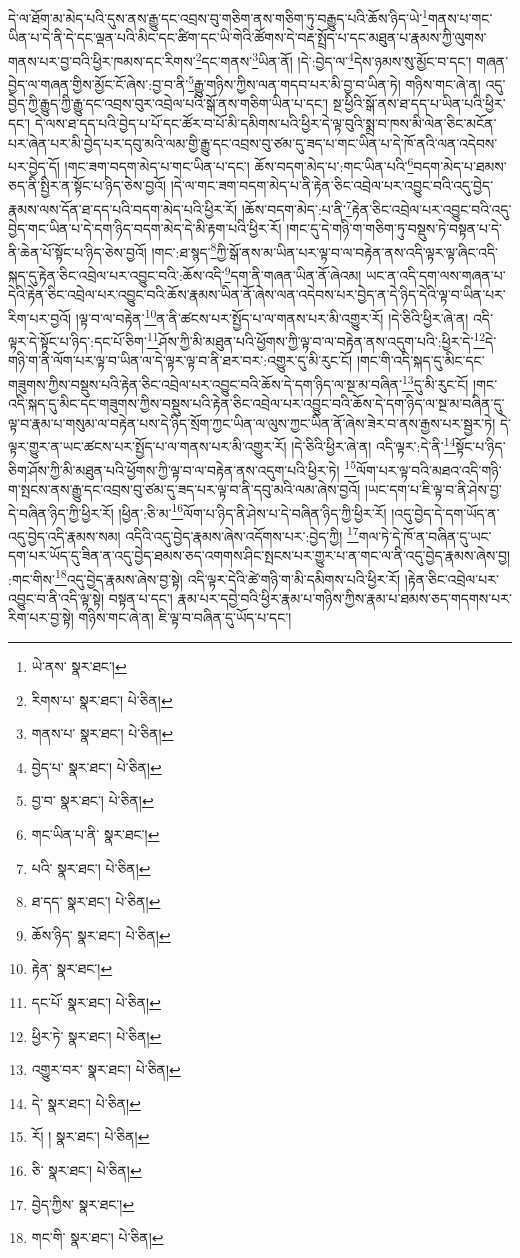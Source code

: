 དེ་ལ་ཐོག་མ་མེད་པའི་དུས་ནས་རྒྱུ་དང་འབྲས་བུ་གཅིག་ནས་གཅིག་ཏུ་བརྒྱུད་པའི་ཆོས་ཉིད་ཡེ་\footnote{ཡེ་ནས་  སྣར་ཐང་། }གནས་པ་གང་ཡིན་པ་དེ་ནི་དེ་དང་ལྡན་པའི་མིང་དང་ཚིག་དང་ཡི་གེའི་ཚོགས་དེ་བརྡ་སྤྲོད་པ་དང་མཐུན་པ་རྣམས་ཀྱི་ལུགས་གནས་པར་བྱ་བའི་ཕྱིར་ཁམས་དང་རིགས་\footnote{རིགས་པ་  སྣར་ཐང་།  པེ་ཅིན། }དང་གནས་\footnote{གནས་པ་  སྣར་ཐང་།  པེ་ཅིན། }ཡིན་ནོ། །དེ་:བྱེད་ལ་\footnote{བྱེད་པ་  སྣར་ཐང་།  པེ་ཅིན། }དེས་ཉམས་སུ་མྱོང་བ་དང་། གཞན་བྱེད་ལ་གཞན་གྱིས་མྱོང་ངོ་ཞེས་:བྱ་བ་ནི་\footnote{བྱ་བ་  སྣར་ཐང་།  པེ་ཅིན། }རྒྱུ་གཉིས་ཀྱིས་ལན་གདབ་པར་མི་བྱ་བ་ཡིན་ཏེ། གཉིས་གང་ཞེ་ན། འདུ་བྱེད་ཀྱི་རྒྱུད་ཀྱི་རྒྱུ་དང་འབྲས་བུར་འབྲེལ་པའི་སྒོ་ནས་གཅིག་ཡིན་པ་དང་། སྔ་ཕྱིའི་སྒོ་ནས་ཐ་དད་པ་ཡིན་པའི་ཕྱིར་དང་། དེ་ལས་ཐ་དད་པའི་བྱེད་པ་པོ་དང་ཚོར་བ་པོ་མི་དམིགས་པའི་ཕྱིར་དེ་ལྟ་བུའི་སྨྲ་བ་ཁས་མི་ལེན་ཅིང་མངོན་པར་ཞེན་པར་མི་བྱེད་པར་དབུ་མའི་ལམ་གྱི་རྒྱུ་དང་འབྲས་བུ་ཙམ་དུ་ཟད་པ་གང་ཡིན་པ་དེ་ཁོ་ནའི་ལན་འདེབས་པར་བྱེད་དོ། །གང་ཟག་བདག་མེད་པ་གང་ཡིན་པ་དང་། ཆོས་བདག་མེད་པ་:གང་ཡིན་པའི་\footnote{གང་ཡིན་པ་ནི་  སྣར་ཐང་། }བདག་མེད་པ་ཐམས་ཅད་ནི་སྤྱིར་ན་སྟོང་པ་ཉིད་ཅེས་བྱའོ། །དེ་ལ་གང་ཟག་བདག་མེད་པ་ནི་རྟེན་ཅིང་འབྲེལ་པར་འབྱུང་བའི་འདུ་བྱེད་རྣམས་ལས་དོན་ཐ་དད་པའི་བདག་མེད་པའི་ཕྱིར་རོ། །ཆོས་བདག་མེད་:པ་ནི་\footnote{པའི་  སྣར་ཐང་།  པེ་ཅིན། }རྟེན་ཅིང་འབྲེལ་པར་འབྱུང་བའི་འདུ་བྱེད་གང་ཡིན་པ་དེ་དག་ཉིད་བདག་མེད་དེ་མི་རྟག་པའི་ཕྱིར་རོ། །གང་དུ་དེ་གཉི་ག་གཅིག་ཏུ་བསྡུས་ཏེ་བསྟན་པ་དེ་ནི་ཆེན་པོ་སྟོང་པ་ཉིད་ཅེས་བྱའོ། །གང་:ཐ་སྙད་\footnote{ཐ་དད་  སྣར་ཐང་།  པེ་ཅིན། }ཀྱི་སྒོ་ནས་མ་ཡིན་པར་ལྟ་བ་ལ་བརྟེན་ནས་འདི་ལྟར་ལྟ་ཞིང་འདི་སྐད་དུ་རྟེན་ཅིང་འབྲེལ་པར་འབྱུང་བའི་:ཆོས་འདི་\footnote{ཆོས་ཉིད་  སྣར་ཐང་།  པེ་ཅིན། }དག་ནི་གཞན་ཡིན་ནོ་ཞེའམ། ཡང་ན་འདི་དག་ལས་གཞན་པ་དེའི་རྟེན་ཅིང་འབྲེལ་པར་འབྱུང་བའི་ཆོས་རྣམས་ཡིན་ནོ་ཞེས་ལན་འདེབས་པར་བྱེད་ན་དེ་ཉིད་དེའི་ལྟ་བ་ཡིན་པར་རིག་པར་བྱའོ། །ལྟ་བ་ལ་བརྟེན་\footnote{རྟེན་  སྣར་ཐང་། }ན་ནི་ཚངས་པར་སྤྱོད་པ་ལ་གནས་པར་མི་འགྱུར་རོ། །དེ་ཅིའི་ཕྱིར་ཞེ་ན། འདི་ལྟར་དེ་སྟོང་པ་ཉིད་:དང་པོ་ཅིག་\footnote{དང་པོ་  སྣར་ཐང་།  པེ་ཅིན། }ཤོས་ཀྱི་མི་མཐུན་པའི་ཕྱོགས་ཀྱི་ལྟ་བ་ལ་བརྟེན་ནས་འདུག་པའི་:ཕྱིར་དེ་\footnote{ཕྱིར་ཏེ་  སྣར་ཐང་།  པེ་ཅིན། }དེ་གཉི་ག་ནི་ལོག་པར་ལྟ་བ་ཡིན་ལ་དེ་ལྟར་ལྟ་བ་ནི་ཐར་བར་:འགྱུར་དུ་མི་རུང་ངོ། །གང་གི་འདི་སྐད་དུ་མིང་དང་གཟུགས་ཀྱིས་བསྡུས་པའི་རྟེན་ཅིང་འབྲེལ་པར་འབྱུང་བའི་ཆོས་དེ་དག་ཉིད་ལ་སྔ་མ་བཞིན་\footnote{འགྱུར་བར་  སྣར་ཐང་།  པེ་ཅིན། }དུ་མི་རུང་ངོ། །གང་འདི་སྐད་དུ་མིང་དང་གཟུགས་ཀྱིས་བསྡུས་པའི་རྟེན་ཅིང་འབྲེལ་པར་འབྱུང་བའི་ཆོས་དེ་དག་ཉིད་ལ་སྔ་མ་བཞིན་དུ་ལྟ་བ་རྣམ་པ་གསུམ་ལ་བརྟེན་པས་དེ་ཉིད་སྲོག་ཀྱང་ཡིན་ལ་ལུས་ཀྱང་ཡིན་ནོ་ཞེས་ཟེར་བ་ནས་རྒྱས་པར་སྦྱར་ཏེ། དེ་ལྟར་གྱུར་ན་ཡང་ཚངས་པར་སྤྱོད་པ་ལ་གནས་པར་མི་འགྱུར་རོ། །དེ་ཅིའི་ཕྱིར་ཞེ་ན། འདི་ལྟར་:དེ་ནི་\footnote{དེ་  སྣར་ཐང་།  པེ་ཅིན། }སྟོང་པ་ཉིད་ཅིག་ཤོས་ཀྱི་མི་མཐུན་པའི་ཕྱོགས་ཀྱི་ལྟ་བ་ལ་བརྟེན་ནས་འདུག་པའི་ཕྱིར་ཏེ། \footnote{རོ། །   སྣར་ཐང་།  པེ་ཅིན། }ལོག་པར་ལྟ་བའི་མཐའ་འདི་གཉི་ག་སྤངས་ནས་རྒྱུ་དང་འབྲས་བུ་ཙམ་དུ་ཟད་པར་ལྟ་བ་ནི་དབུ་མའི་ལམ་ཞེས་བྱའོ། །ཡང་དག་པ་ཇི་ལྟ་བ་ནི་ཤེས་བྱ་དེ་བཞིན་ཉིད་ཀྱི་ཕྱིར་རོ། །ཕྱིན་:ཅི་མ་\footnote{ཅི་  སྣར་ཐང་།  པེ་ཅིན། }ལོག་པ་ཉིད་ནི་ཤེས་པ་དེ་བཞིན་ཉིད་ཀྱི་ཕྱིར་རོ། །འདུ་བྱེད་དེ་དག་ཡོད་ན་འདུ་བྱེད་འདི་རྣམས་སམ། འདིའི་འདུ་བྱེད་རྣམས་ཞེས་འདོགས་པར་:བྱེད་ཀྱི། \footnote{བྱེད་ཀྱིས་  སྣར་ཐང་། }གལ་ཏེ་དེ་ཁོ་ན་བཞིན་དུ་ཡང་དག་པར་ཡོད་དུ་ཟིན་ན་འདུ་བྱེད་ཐམས་ཅད་འགགས་ཤིང་སྤངས་པར་གྱུར་པ་ན་གང་ལ་ནི་འདུ་བྱེད་རྣམས་ཞེས་བྱ། :གང་གིས་\footnote{གང་གི་  སྣར་ཐང་།  པེ་ཅིན། }འདུ་བྱེད་རྣམས་ཞེས་བྱ་སྟེ། འདི་ལྟར་དེའི་ཚེ་གཉི་ག་མི་དམིགས་པའི་ཕྱིར་རོ། །རྟེན་ཅིང་འབྲེལ་པར་འབྱུང་བ་ནི་འདི་ལྟ་སྟེ། བསྟན་པ་དང་། རྣམ་པར་དབྱེ་བའི་ཕྱིར་རྣམ་པ་གཉིས་ཀྱིས་རྣམ་པ་ཐམས་ཅད་གདགས་པར་རིག་པར་བྱ་སྟེ། གཉིས་གང་ཞེ་ན། ཇི་ལྟ་བ་བཞིན་དུ་ཡོད་པ་དང་། 